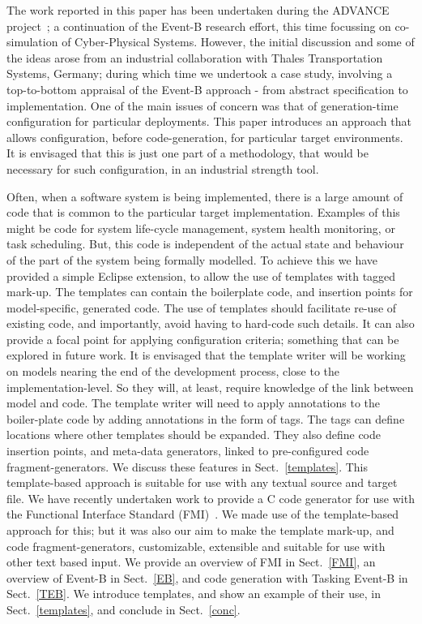 \documentclass{llncs}%
\begin{document}
The work reported in this paper has been undertaken during the ADVANCE project~\cite{advance}; a continuation of the Event-B research effort, this time focussing on co-simulation of Cyber-Physical Systems. However, the initial discussion and some of the ideas arose from an industrial collaboration with Thales Transportation Systems, Germany; during which time we undertook a case study, involving a top-to-bottom appraisal of the Event-B approach - from abstract specification to implementation. One of the main issues of concern was that of generation-time configuration for particular deployments.  This paper introduces an approach that allows configuration, before code-generation, for particular target environments. It is envisaged that this is just one part of a methodology, that would be necessary for such configuration, in an industrial strength tool.   

Often, when a software system is being implemented, there is a large amount of code that is common to the particular target implementation. Examples of this might be code for system life-cycle management, system health monitoring, or task scheduling. But, this code is independent of the actual state and behaviour of the part of the system being formally modelled. To achieve this we have provided a simple Eclipse extension, to allow the use of templates with tagged mark-up. The templates can contain the boilerplate code, and insertion points for model-specific, generated code. The use of templates should facilitate re-use of existing code, and importantly, avoid having to hard-code such details. It can also provide a focal point for applying configuration criteria; something that can be explored in future work. It is envisaged that the template writer will be working on models nearing the end of the development process, close to the implementation-level. So they will, at least, require knowledge of the link between model and code. The template writer will need to apply annotations to the boiler-plate code by adding annotations in the form of tags. The tags can define locations where other templates should be expanded. They also define code insertion points, and meta-data generators, linked to pre-configured code fragment-generators. We discuss these features in Sect.~\ref{templates}. This template-based approach is suitable for use with any textual source and target file. We have recently undertaken work to provide a C code generator for use with the Functional Interface Standard (FMI)~\cite{bloch2012,bloch2011,FMISTD}. We made use of the template-based approach for this; but it was also our aim to make the template mark-up, and code fragment-generators, customizable, extensible and suitable for use with other text based input. We provide an overview of FMI in Sect.~\ref{FMI}, an overview of Event-B in Sect.~\ref{EB}, and code generation with Tasking Event-B in Sect.~\ref{TEB}. We introduce templates, and show an example of their use, in Sect.~\ref{templates}, and conclude in Sect.~\ref{conc}.
%
%
\end{document}
